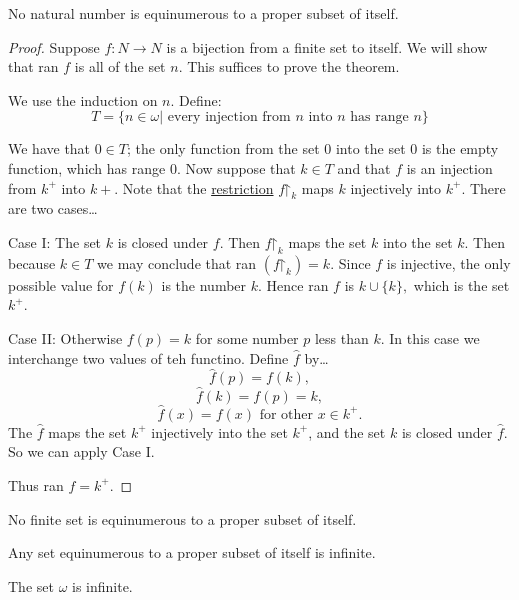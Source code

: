 \begin{theorem}\label{pigeonholeprinciple}
No natural number is equinumerous to a proper subset of itself.
\end{theorem}

\begin{proof}
Suppose $f : N \rightarrow N$ is a bijection from a finite set to itself. We will show that ran $f$ is all of the set $n$. This suffices to prove the theorem.

We use the induction on $n$. Define:
$$T = \{ n \in \omega | \textrm{ every injection from } n \textrm{ into } n \textrm{ has range } n \}$$

We have that $0 \in T$; the only function from the set $0$ into the set $0$ is the empty function, which has range $0$. Now suppose that $k \in T$ and that $f$ is an injection from $k^+$ into $k+$. Note that 
the \hyperref[restriction]{restriction} $f \mathord{\upharpoonright}_k$ maps $k$ injectively into $k^+$. There are two cases\dots

Case I: The set $k$ is closed under $f$. Then $f \mathord{\upharpoonright}_k$ maps the set $k$ into the set $k$. Then because $k \in T$ we may conclude that ran $(f \mathord{\upharpoonright}_k) = k$. Since
$f$ is injective, the only possible value for $f(k)$ is the number $k$. Hence ran $f$ is $k \cup \{ k \},$ which is the set $k^+$.

Case II: Otherwise $f(p) = k$ for some number $p$ less than $k$. In this case we interchange two values of teh functino. Define $\hat{f}$ by\dots
$$\hat{f}(p) = f(k),$$
$$\hat{f}(k) = f(p) = k,$$
$$\hat{f}(x) = f(x) \textrm{ for other } x \in k^+.$$
The $\hat{f}$ maps the set $k^+$ injectively into the set $k^+$, and the set $k$ is closed under $\hat{f}$. So we can apply Case I.

Thus ran $f = k^+$.
\end{proof}

\begin{corollary}
No finite set is equinumerous to a proper subset of itself.
\end{corollary}

\begin{corollary}
Any set equinumerous to a proper subset of itself is infinite.
\end{corollary}

\begin{corollary}
The set $\omega$ is infinite.
\end{corollary}

